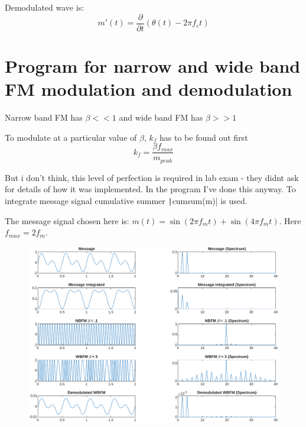 Demodulated wave is:
$$m'(t) = \frac{\partial}{\partial t} (\theta(t) - 2 \pi f_c t)$$

\section{Program for narrow and wide band FM modulation and demodulation}
Narrow band FM has $\beta << 1$ and wide band FM has $\beta >> 1$

To modulate at a particular value of $\beta$, $k_f$ has to be found out first
$$k_f =\frac{\beta f_{max}}{m_{peak}}$$

But i don't think, this level of perfection is required in lab exam - they didnt ask for details of how it was implemented.
In the program I've done this anyway. To integrate message signal cumulative summer \texttt|cumsum(m)| is used.

The message signal chosen here is: $m(t) = \sin(2 \pi f_m t) + \sin(4 \pi f_m t)$. Here $f_{max} = 2f_m$.


\begin{figure}[!ht]
	\centering
	\includegraphics[width=\textwidth]{img/fm.pdf}
\end{figure}

\pagebreak